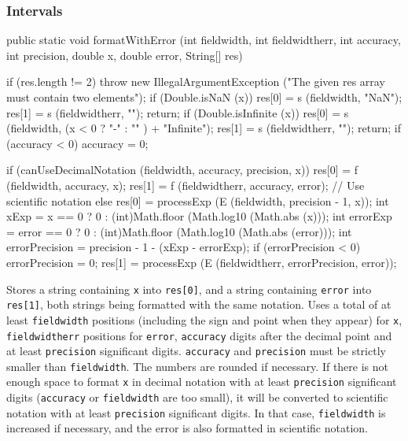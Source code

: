 \subsubsection*{Intervals}
\begin{code}

   public static void formatWithError (int fieldwidth, int fieldwidtherr,
          int accuracy, int precision, double x, double error, String[] res)\begin{hide} {
      if (res.length != 2)
         throw new IllegalArgumentException ("The given res array must contain two elements");
      if (Double.isNaN (x)) {
         res[0] = s (fieldwidth, "NaN");
         res[1] = s (fieldwidtherr, "");
         return;
      }
      if (Double.isInfinite (x)) {
         res[0] = s (fieldwidth, (x < 0 ? "-" : "" ) + "Infinite");
         res[1] = s (fieldwidtherr, "");
         return;
      }
      if (accuracy < 0)
         accuracy = 0;

      if (canUseDecimalNotation (fieldwidth, accuracy, precision, x)) {
         res[0] = f (fieldwidth, accuracy, x);
         res[1] = f (fieldwidtherr, accuracy, error);
      }
      // Use scientific notation
      else {
         res[0] = processExp (E (fieldwidth, precision - 1, x));
         int xExp = x == 0 ? 0 : (int)Math.floor (Math.log10 (Math.abs (x)));
         int errorExp = error == 0 ? 0 : (int)Math.floor (Math.log10 (Math.abs (error)));
         int errorPrecision = precision - 1 - (xExp - errorExp);
         if (errorPrecision < 0)
            errorPrecision = 0;
         res[1] = processExp (E (fieldwidtherr, errorPrecision, error));
      }
   }\end{hide}
\end{code}
\begin{tabb}
   Stores a string containing \texttt{x} into \texttt{res[0]}, and
   a string containing \texttt{error} into \texttt{res[1]}, both strings being
   formatted with the same notation.
   Uses a total of at least
   \texttt{fieldwidth} positions (including the sign and point when they appear)
   for \texttt{x}, \texttt{fieldwidtherr} positions for \texttt{error},
   \texttt{accuracy} digits after the decimal point and at least \texttt{precision}
   significant digits. \texttt{accuracy} and \texttt{precision} must be strictly
   smaller than \texttt{fieldwidth}. The numbers are rounded if necessary.
   If there is not enough space to format \texttt{x} in decimal notation
   with at least \texttt{precision} significant digits (\texttt{accuracy} or
   \texttt{fieldwidth} are too small), it will be converted to scientific
   notation with at least \texttt{precision} significant digits.
   In that case, \texttt{fieldwidth} is increased if necessary, and
   the error is also formatted in scientific notation.
\end{tabb}
